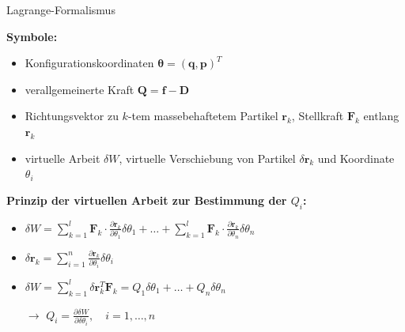 \documentclass[
	ngerman,
	10pt,				%
	aspectratio=169, 	%
	xcolor=dvipsnames
]{beamer}
\begin{document}
\begin{frame}[t,fragile,label=Lagrange2_2]{\large Lagrange-Formalismus}
	
	\textbf{Symbole:}
	\begin{itemize}
		\item Konfigurationskoordinaten $\boldsymbol{\theta} = (\mathbf{q}, \mathbf{p})^T$
		\item verallgemeinerte Kraft $\mathbf{Q} = \mathbf{f} - \mathbf{D}$
		\pause
		\item Richtungsvektor zu $k$-tem massebehaftetem Partikel $\mathbf{r}_k$, Stellkraft $\mathbf{F}_k$ entlang $\mathbf{r}_k$
		\pause
		\item virtuelle Arbeit $\delta W$, virtuelle Verschiebung von Partikel $\delta \mathbf{r}_k$ und Koordinate $\theta_{i}$
	\end{itemize}
	
	\pause
	\bigskip
	\textbf{Prinzip der virtuellen Arbeit zur Bestimmung der $Q_i$:}
	\begin{itemize}
		\pause
		\item  $\delta W = \sum_{k=1}^l \mathbf{F}_k \cdot \frac{\partial \mathbf{r}_k}{\partial \theta_1} \delta \theta_1 +\ldots + \sum_{k=1}^l \mathbf{F}_k \cdot \frac{\partial \mathbf{r}_k}{\partial \theta_n} \delta \theta_n$
		\pause
		\item $\delta \mathbf{r}_{k} = \sum_{i = 1}^{n} \frac{\partial\mathbf{r}_{k}}{\partial\theta_i} \delta \theta_i$
		\pause
		\item $\delta W = \sum_{k=1}^{l}\delta \mathbf{r}_k^T \mathbf{F}_k = Q_1 \delta \theta_1 + \ldots + Q_n\delta \theta_n$
		\pause
		\item[$\rightarrow$] $Q_i = \frac{\partial\delta W}{\partial \delta \theta_i} ,\quad i=1,\ldots, n$
	\end{itemize}
	
\end{frame}

\end{document}
